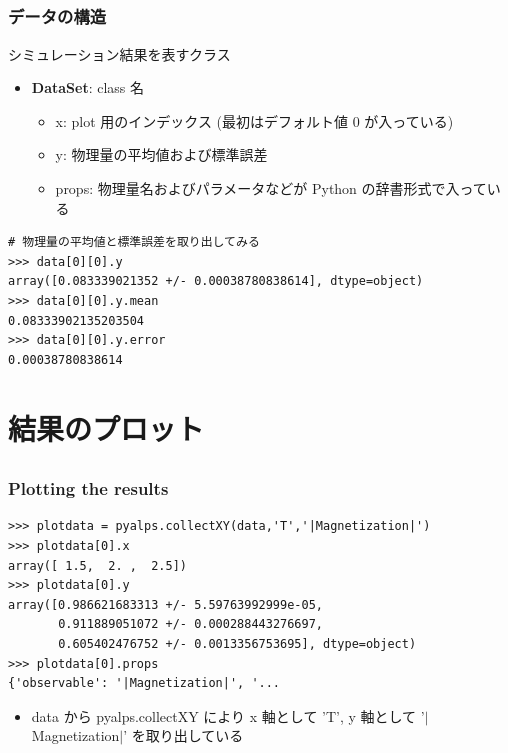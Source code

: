 \subsection*{\redm\whiteb\greenb}
\begin{frame}[t,fragile]
\frametitle{データの構造}
シミュレーション結果を表すクラス
\begin{itemize}
\item \textbf{DataSet}: class 名
  \begin{itemize}
  \item x: plot 用のインデックス (最初はデフォルト値 0 が入っている)
  \item y: 物理量の平均値および標準誤差
  \item props: 物理量名およびパラメータなどが Python の辞書形式で入っている
  \end{itemize}
\end{itemize}

\begin{lstlisting}
# 物理量の平均値と標準誤差を取り出してみる
>>> data[0][0].y
array([0.083339021352 +/- 0.00038780838614], dtype=object)
>>> data[0][0].y.mean
0.08333902135203504
>>> data[0][0].y.error
0.00038780838614
\end{lstlisting}
\end{frame}

\section{結果のプロット}

\subsection*{\redm\whiteb\greenb}
\begin{frame}[t,fragile]
\frametitle{Plotting the results}
\begin{lstlisting}
>>> plotdata = pyalps.collectXY(data,'T','|Magnetization|')
>>> plotdata[0].x
array([ 1.5,  2. ,  2.5])
>>> plotdata[0].y
array([0.986621683313 +/- 5.59763992999e-05,
       0.911889051072 +/- 0.000288443276697,
       0.605402476752 +/- 0.0013356753695], dtype=object)
>>> plotdata[0].props
{'observable': '|Magnetization|', '...
\end{lstlisting}
\begin{itemize}
\item data から pyalps.collectXY により x 軸として 'T', y 軸として '$|$Magnetization$|$' を取り出している
\end{itemize}
\end{frame}

